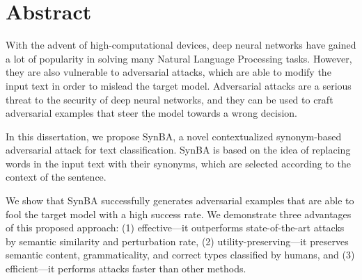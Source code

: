 
\cleardoublepage
{}
{}
\begingroup
\let\clearpage\relax
\let\cleardoublepage\relax
\let\cleardoublepage\relax

\chapter*{Abstract}

With the advent of high-computational devices, deep neural networks have gained a lot of popularity in solving many Natural Language Processing tasks. 
However, they are also vulnerable to adversarial attacks, which are able to modify the input text in order to mislead the target model. 
Adversarial attacks are a serious threat to the security of deep neural networks, and they can be used to craft adversarial examples that steer the model towards a wrong decision.

In this dissertation, we propose SynBA, a novel contextualized synonym-based adversarial attack for text classification. 
SynBA is based on the idea of replacing words in the input text with their synonyms, which are selected according to the context of the sentence. 

We show that SynBA successfully generates adversarial examples that are able to fool the target model with a high success rate. 
We demonstrate three advantages of this proposed approach: (1) effective---it outperforms state-of-the-art attacks by semantic similarity and perturbation rate, (2) utility-preserving---it preserves semantic content, grammaticality, and correct types classified by humans, and (3) efficient---it performs attacks faster than other methods.


\endgroup

\vfill

